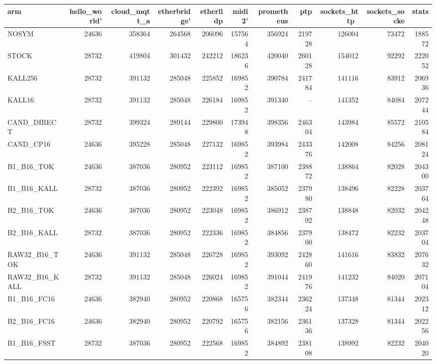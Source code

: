 \begin{tabular}{lrrrrrrrrrr}
\toprule
arm & hello\_world' & cloud\_mqtt\_a & etherbridge' & etherlldp & midi2' & prometheus & ptp & sockets\_http\ & sockets\_socke & stats \\
\midrule
NOSYM & 24636 & 358364 & 264568 & 206096 & 157564 & 356924 & 219728 & 126004 & 73472 & 188572 \\
STOCK & 28732 & 419804 & 301432 & 242212 & 186236 & 420040 & 260128 & 154012 & 92292 & 222052 \\
KALL256 & 28732 & 391132 & 285048 & 225852 & 169852 & 390784 & 241784 & 141116 & 83912 & 206936 \\
KALL16 & 28732 & 391132 & 285048 & 226184 & 169852 & 391340 & -- & 141352 & 84084 & 207244 \\
CAND\_DIRECT & 28732 & 399324 & 289144 & 229800 & 173948 & 398356 & 246304 & 143984 & 85572 & 210584 \\
CAND\_CP16 & 24636 & 395228 & 285048 & 227132 & 169852 & 393984 & 243376 & 142008 & 84256 & 208124 \\
B1\_B16\_TOK & 24636 & 387036 & 280952 & 223112 & 169852 & 387100 & 238872 & 138864 & 82028 & 204300 \\
B1\_B16\_KALL & 28732 & 387036 & 280952 & 222392 & 169852 & 385052 & 237980 & 138496 & 82228 & 203764 \\
B2\_B16\_TOK & 24636 & 387036 & 280952 & 223048 & 169852 & 386912 & 238792 & 138848 & 82032 & 204248 \\
B2\_B16\_KALL & 28732 & 387036 & 280952 & 222336 & 169852 & 384856 & 237900 & 138472 & 82232 & 203704 \\
RAW32\_B16\_TOK & 24636 & 391132 & 285048 & 226728 & 169852 & 393092 & 242860 & 141616 & 83832 & 207632 \\
RAW32\_B16\_KALL & 28732 & 391132 & 285048 & 226024 & 169852 & 391044 & 241976 & 141232 & 84020 & 207104 \\
B1\_B16\_FC16 & 24636 & 382940 & 280952 & 220868 & 165756 & 382344 & 236224 & 137348 & 81344 & 202312 \\
B2\_B16\_FC16 & 24636 & 382940 & 280952 & 220792 & 165756 & 382156 & 236136 & 137328 & 81344 & 202256 \\
B1\_B16\_FSST & 28732 & 387036 & 280952 & 222568 & 169852 & 384892 & 238108 & 138992 & 82232 & 204020 \\
\bottomrule
\end{tabular}
